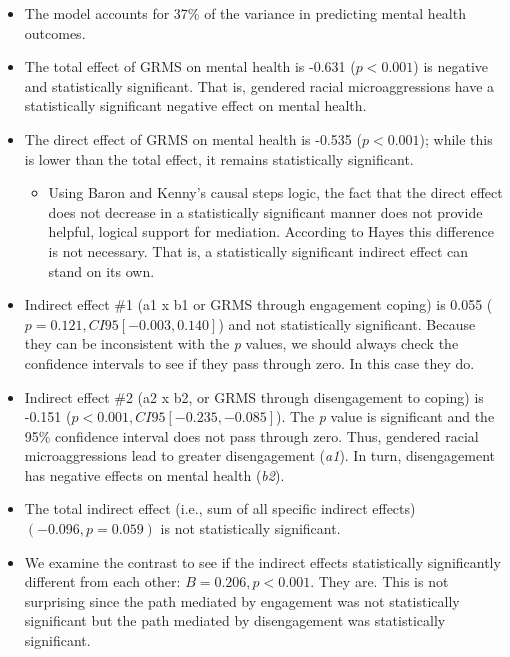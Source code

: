 \documentclass[
  11pt,
]{book}
\providecommand{\tightlist}{%
  \setlength{\itemsep}{0pt}\setlength{\parskip}{0pt}}
\begin{document}
\begin{itemize}
\tightlist
\item
  The model accounts for 37\% of the variance in predicting mental health outcomes.
\item
  The total effect of GRMS on mental health is -0.631 (\(p < 0.001\)) is negative and statistically significant. That is, gendered racial microaggressions have a statistically significant negative effect on mental health.
\item
  The direct effect of GRMS on mental health is -0.535 (\(p < 0.001\)); while this is lower than the total effect, it remains statistically significant.

  \begin{itemize}
  \tightlist
  \item
    Using Baron and Kenny's \citeyearpar{baron_moderator-mediator_1986} causal steps logic, the fact that the direct effect does not decrease in a statistically significant manner does not provide helpful, logical support for mediation. According to Hayes \citeyearpar{hayes_more_2022} this difference is not necessary. That is, a statistically significant indirect effect can stand on its own.
  \end{itemize}
\item
  Indirect effect \#1 (a1 x b1 or GRMS through engagement coping) is 0.055 (\(p = 0.121, CI95[-0.003, 0.140]\)) and not statistically significant. Because they can be inconsistent with the \emph{p} values, we should always check the confidence intervals to see if they pass through zero. In this case they do.
\item
  Indirect effect \#2 (a2 x b2, or GRMS through disengagement to coping) is -0.151 (\(p < 0.001, CI95[-0.235, -0.085]\)). The \emph{p} value is significant and the 95\% confidence interval does not pass through zero. Thus, gendered racial microaggressions lead to greater disengagement (\emph{a1}). In turn, disengagement has negative effects on mental health (\emph{b2}).
\item
  The total indirect effect (i.e., sum of all specific indirect effects) \((-0.096, p = 0.059)\) is not statistically significant.
\item
  We examine the contrast to see if the indirect effects statistically significantly different from each other: \(B= 0.206, p < 0.001\). They are. This is not surprising since the path mediated by engagement was not statistically significant but the path mediated by disengagement was statistically significant.
\end{itemize}
\end{document}
